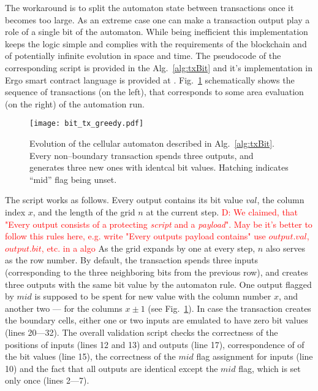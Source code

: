 \documentclass[runningheads]{llncs}
\newcommand{\dnote}[1]{\textcolor{red}{D: {#1}}}
\newcommand{\payload}{\textit{payload}}
\newcommand{\script}{\textit{script}}
\begin{document}
    The workaround is to split the automaton state between
    transactions once it becomes too large. As an extreme case one can make a
    transaction output play a role of a single bit of the automaton. While being
    inefficient this implementation keeps the logic simple and complies with the
    requirements of the blockchain and of potentially infinite evolution in
    space and time. The pseudocode of the corresponding script is
    provided in the Alg.~\ref{alg:txBit} and it's implementation in Ergo smart
    contract language is provided at \cite{ergoScript2}. Fig.~\ref{fig:bit_txs}
    schematically shows the sequence of transactions (on the left), that corresponds
    to some area evaluation (on the right) of the automation run.
    \begin{figure}[h]
        \centering
        \texttt{[image: bit\_tx\_greedy.pdf]}
        \caption{Evolution of the cellular automaton described in
            Alg.~\ref{alg:txBit}. Every non--boundary transaction spends three
            outputs, and generates three new ones with identcal bit values.
            Hatching indicates ``mid'' flag being unset.
        \label{fig:bit_txs} }
    \end{figure}
    

	The script works as follows. Every output contains its bit value $val$, %
    the column index $x$, and the length of the grid $n$ at the current step.
    \dnote{We claimed, that "Every output consists of a protecting \script{} and a
    \payload{}". May be it's better to follow this rules here, e.g. write "Every
    outputs payload contains" use $output.val$, $output.bit$, etc. in a algo} As the
    grid expands by one at every step, $n$ also serves as the row number. By
    default, the transaction spends three inputs (corresponding to the three
    neighboring bits from the previous row), and creates three outputs with the same
    bit value by the automaton rule. One output flagged by $mid$ is supposed to be
    spent for new value with the column number $x$, and another two --- for the
    columns $x\pm 1$ (see Fig.~\ref{fig:bit_txs}). In case the transaction creates the
    boundary cells, either one or two inputs are emulated to have zero bit values
    (lines 20---32).  The overall validation script checks the correctness of the
    positions of inputs (lines 12 and 13) and outputs (line 17), correspondence of
    of the bit values (line 15), the correctness of the $mid$  flag assignment for
    inputs (line 10) and the fact that all outputs are identical except the $mid$
    flag, which is set only once (lines 2---7).
\end{document}

